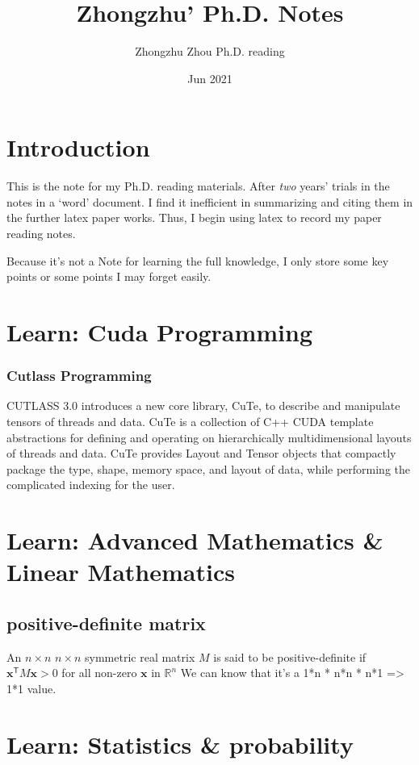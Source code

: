 \documentclass[UTF8]{article}
\title{Zhongzhu' Ph.D. Notes}
\author{Zhongzhu Zhou Ph.D. reading}
\date{Jun 2021}
\begin{document}
\maketitle

\tableofcontents

\section{Introduction}
This is the note for my Ph.D. reading materials. After \emph{two} years' trials in the notes in a `word' document. I find it inefficient in summarizing and citing them in the further latex paper works. Thus, I begin using latex to record my paper reading notes.

Because it's not a Note for learning the full knowledge, I only store some key points or some points I may forget easily.
\section{Learn: Cuda Programming}\label{sec:cutlasslearning}
\subsubsection{Cutlass Programming}
CUTLASS 3.0 introduces a new core library, CuTe, to describe and manipulate tensors of threads and data. CuTe is a collection of C++ CUDA template abstractions for defining and operating on hierarchically multidimensional layouts of threads and data. CuTe provides Layout and Tensor objects that compactly package the type, shape, memory space, and layout of data, while performing the complicated indexing for the user.

\section{Learn: Advanced Mathematics \& Linear Mathematics}
\subsection{positive-definite matrix}
An $n \times n$ $n \times n$ symmetric real matrix $M$ is said to be positive-definite if $\mathbf{x}^\textsf{T} M \mathbf{x} >0 $ for all non-zero $\mathbf{x}$  in $\mathbb{R} ^{n}$
We can know that it's a 1*n * n*n * n*1 => 1*1 value.



\section{Learn: Statistics \& probability}
\end{document}
